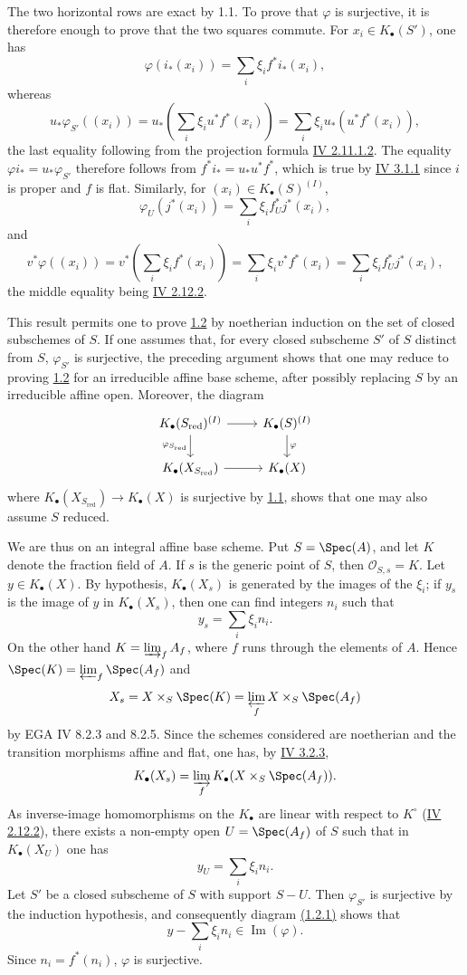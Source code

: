 The two horizontal rows are exact by 1.1. To prove that $\varphi$ is surjective, it is therefore enough to prove that the two squares commute. For $x_i\in K_\bullet(S')$, one has
\[
 \varphi(i_*(x_i))=\sum_i \xi_i f^*i_*(x_i),
\]
whereas
\[
 u_*\varphi_{S'}((x_i))=u_*\left(\sum_i\xi_i u^*f^*(x_i)\right)=\sum_i \xi_i u_*(u^*f^*(x_i)),
\]
the last equality following from the projection formula \hyperlink{sga6.e04.eq.2-11-1-2}{IV 2.11.1.2}. The equality $\varphi i_*=u_*\varphi_{S'}$ therefore follows from $f^*i_*=u_*u^*f^*$, which is true by \hyperlink{sga6.e04.prop.3-1-1}{IV 3.1.1} since $i$ is proper and $f$ is flat. Similarly, for $(x_i)\in K_\bullet(S)^{(I)}$,
\[
 \varphi_U(j^*(x_i))=\sum_i\xi_i f_U^*j^*(x_i),
\]
and
\[
 v^*\varphi((x_i))=v^*\left(\sum_i\xi_i f^*(x_i)\right)=\sum_i\xi_i v^*f^*(x_i)=\sum_i\xi_i f_U^*j^*(x_i),
\]
the middle equality being \hyperlink{sga6.e04.eq.2-12-2}{IV 2.12.2}.

This result permits one to prove \hyperlink{sga6.e09.prop.1-2}{1.2} by noetherian induction on the set of closed subschemes of $S$. If one assumes that, for every closed subscheme $S'$ of $S$ distinct from $S$, $\varphi_{S'}$ is surjective, the preceding argument shows that one may reduce to proving \hyperlink{sga6.e09.prop.1-2}{1.2} for an irreducible affine base scheme, after possibly replacing $S$ by an irreducible affine open. Moreover, the diagram
\[
\begin{tikzcd}
K_\bullet(S_{\mathrm{red}})^{(I)} \arrow[r] \arrow[d,"\varphi_{S_{\mathrm{red}}}"'] & K_\bullet(S)^{(I)} \arrow[d,"\varphi"]\\
K_\bullet(X_{S_{\mathrm{red}}}) \arrow[r] & K_\bullet(X)
\end{tikzcd}
\]
where $K_\bullet(X_{S_{\mathrm{red}}})\to K_\bullet(X)$ is surjective by \hyperlink{sga6.e09.prop.1-1}{1.1}, shows that one may also assume $S$ reduced.

We are thus on an integral affine base scheme. Put $S=\Spec(A)$, and let $K$ denote the fraction field of $A$. If $s$ is the generic point of $S$, then $\mathcal O_{S,s}=K$. Let $y\in K_\bullet(X)$. By hypothesis, $K_\bullet(X_s)$ is generated by the images of the $\xi_i$; if $y_s$ is the image of $y$ in $K_\bullet(X_s)$, then one can find integers $n_i$ such that
\[
 y_s=\sum_i \xi_i n_i.
\]
On the other hand $K=\varinjlim_f A_f$, where $f$ runs through the elements of $A$. Hence $\Spec(K)=\varprojlim_f \Spec(A_f)$ and
\[
 X_s=X\times_S\Spec(K)=\varprojlim_f X\times_S\Spec(A_f)
\]
by EGA IV 8.2.3 and 8.2.5. Since the schemes considered are noetherian and the transition morphisms affine and flat, one has, by \hyperlink{sga6.e04.para.3-2-3}{IV 3.2.3},
\[
 K_\bullet(X_s)=\varinjlim_f K_\bullet(X\times_S\Spec(A_f)).
\]
As inverse-image homomorphisms on the $K_\bullet$ are linear with respect to $K^\circ$ (\hyperlink{sga6.e04.eq.2-12-2}{IV 2.12.2}), there exists a non-empty open $U=\Spec(A_f)$ of $S$ such that in $K_\bullet(X_U)$ one has
\[
 y_U=\sum_i \xi_i n_i.
\]
Let $S'$ be a closed subscheme of $S$ with support $S-U$. Then $\varphi_{S'}$ is surjective by the induction hypothesis, and consequently diagram \hyperlink{sga6.e09.eq.1-2-1}{(1.2.1)} shows that
\[
 y-
\sum_i\xi_i n_i\in \operatorname{Im}(\varphi).
\]
Since $n_i=f^*(n_i)$, $\varphi$ is surjective.

